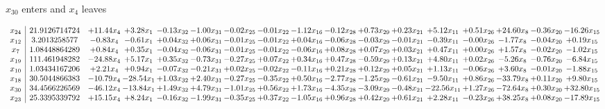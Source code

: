 \documentclass[9pt]{article}
\begin{document}
 $ x_{30} $ enters and $ x_{4} $ leaves 

 \[\begin{array}{c| c c@{\hskip 2pt} c@{\hskip 2pt} c@{\hskip 2pt} c@{\hskip 2pt} c@{\hskip 2pt} c@{\hskip 2pt} c@{\hskip 2pt} c@{\hskip 2pt} c@{\hskip 2pt} c@{\hskip 2pt} c@{\hskip 2pt} c@{\hskip 2pt} c@{\hskip 2pt} c@{\hskip 2pt} c@{\hskip 2pt} }
 x_{24}   &  21.9126714724 & + 11.44 x_{4} & +  3.28 x_{1} & -0.13 x_{32} & -1.00 x_{31} & -0.02 x_{25} & -0.01 x_{22} & -1.12 x_{16} & -0.12 x_{28} & +  0.73 x_{29} & +  0.23 x_{21} & +  5.12 x_{11} & +  0.51 x_{26} & + 24.60 x_{8} & -0.36 x_{20} & -16.26 x_{15}\\
 x_{12}   &  3.2013258577 & -0.83 x_{4} & -0.61 x_{1} & +  0.04 x_{32} & +  0.06 x_{31} & -0.01 x_{25} & -0.01 x_{22} & +  0.04 x_{16} & -0.06 x_{28} & -0.03 x_{29} & -0.01 x_{21} & -0.39 x_{11} & -0.00 x_{26} & -1.77 x_{8} & -0.04 x_{20} & +  0.19 x_{15}\\
 x_{7}   &  1.08448864289 & +  0.84 x_{4} & +  0.35 x_{1} & -0.04 x_{32} & -0.06 x_{31} & -0.01 x_{25} & -0.01 x_{22} & -0.06 x_{16} & +  0.08 x_{28} & +  0.07 x_{29} & +  0.03 x_{21} & +  0.47 x_{11} & +  0.00 x_{26} & +  1.57 x_{8} & -0.02 x_{20} & -1.02 x_{15}\\
 x_{19}   &  111.461948282 & -24.88 x_{4} & +  5.17 x_{1} & +  0.35 x_{32} & -0.73 x_{31} & -0.27 x_{25} & +  0.07 x_{22} & +  0.34 x_{16} & +  0.47 x_{28} & -0.59 x_{29} & +  0.13 x_{21} & +  4.80 x_{11} & +  0.02 x_{26} & -5.26 x_{8} & -0.76 x_{20} & -6.84 x_{15}\\
 x_{10}   &  1.03434167206 & +  2.21 x_{4} & +  0.94 x_{1} & -0.07 x_{32} & -0.21 x_{31} & +  0.02 x_{25} & -0.02 x_{22} & -0.11 x_{16} & +  0.21 x_{28} & +  0.12 x_{29} & +  0.05 x_{21} & +  1.13 x_{11} & -0.06 x_{26} & +  3.60 x_{8} & -0.01 x_{20} & -1.88 x_{15}\\
 x_{18}   &  30.5044866383 & -10.79 x_{4} & -28.54 x_{1} & +  1.03 x_{32} & +  2.40 x_{31} & -0.27 x_{25} & -0.35 x_{22} & +  0.50 x_{16} & -2.77 x_{28} & -1.25 x_{29} & -0.61 x_{21} & -9.50 x_{11} & +  0.86 x_{26} & -33.79 x_{8} & +  0.11 x_{20} & +  9.80 x_{15}\\
 x_{30}   &  34.4566226569 & -46.12 x_{4} & -13.84 x_{1} & +  1.49 x_{32} & +  4.79 x_{31} & -1.01 x_{25} & +  0.56 x_{22} & +  1.73 x_{16} & -4.35 x_{28} & -3.09 x_{29} & -0.48 x_{21} & -22.56 x_{11} & +  1.27 x_{26} & -72.64 x_{8} & +  0.30 x_{20} & + 32.80 x_{15}\\
 x_{23}   &  25.3395339792 & + 15.15 x_{4} & +  8.24 x_{1} & -0.16 x_{32} & -1.99 x_{31} & -0.35 x_{25} & +  0.37 x_{22} & -1.05 x_{16} & +  0.96 x_{28} & +  0.42 x_{29} & +  0.61 x_{21} & +  2.28 x_{11} & -0.23 x_{26} & + 38.25 x_{8} & +  0.08 x_{20} & -17.89 x_{15}\\

\end{array}\]
\end{document}
